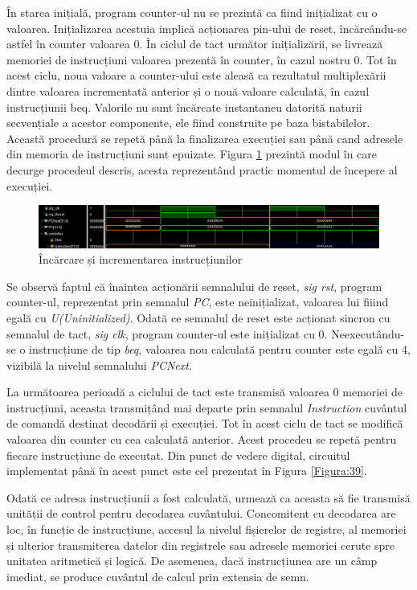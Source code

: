 \documentclass[12pt]{article}
\begin{document}
 În starea inițială, program counter-ul nu se prezintă ca fiind inițializat cu o valoarea. Inițializarea acestuia implică acționarea pin-ului de reset, încărcându-se astfel în counter valoarea 0. În ciclul de tact următor inițializării, se livrează memoriei de instrucțiuni valoarea prezentă în counter, în cazul nostru 0. Tot în acest ciclu, noua valoare a counter-ului este aleasă ca rezultatul multiplexării dintre valoarea incrementată anterior și o nouă valoare calculată, în cazul instrucțiunii beq. Valorile nu sunt încărcate instantaneu datorită naturii secvențiale a acestor componente, ele fiind construite pe baza bistabilelor. Această procedură se repetă până la finalizarea execuției sau până cand adresele din memoria de instrucțiuni sunt epuizate. Figura \ref{Figura:50} prezintă modul în care decurge procedeul descris, acesta reprezentând practic momentul de începere al execuției.

 \begin{figure}[h!]
 \includegraphics[width=1.025\textwidth]{tbfetch.png}
 \centering
 \caption{Încărcare și incrementarea instrucțiunilor}
 \label{Figura:50}
 \end{figure}
 
 Se observă faptul că înaintea acționării semnalului de reset, \textit{sig rst}, program counter-ul, reprezentat prin semnalul \textit{PC}, este neinițializat, valoarea lui fiiind egală cu \textit{U(Uninitialized)}. Odată ce semnalul de reset este acționat sincron cu semnalul de tact, \textit{sig clk}, program counter-ul este inițializat cu 0. Neexecutându-se o instrucțiune de tip \textit{beq}, valoarea nou calculată pentru counter este egală cu 4, vizibilă la nivelul semnalului \textit{PCNext}.
 
 La următoarea perioadă a ciclului de tact este transmisă valoarea 0 memoriei de instrucțiuni, aceasta transmițând mai departe prin semnalul \textit{Instruction} cuvântul de comandă destinat decodării și execuției. Tot în acest ciclu de tact se modifică valoarea din counter cu cea calculată anterior. Acest procedeu se repetă pentru fiecare instrucțiune de executat. Din punct de vedere digital, circuitul implementat până în acest punct este cel prezentat în Figura \ref{Figura:39}. 

Odată ce adresa instrucțiunii a fost calculată, urmează ca aceasta să fie transmisă unității de control pentru decodarea cuvântului. Concomitent cu decodarea are loc, în funcție de instrucțiune, accesul la nivelul fișierelor de registre, al memoriei și ulterior transmiterea datelor din registrele sau adresele memoriei cerute spre unitatea aritmetică și logică. De asemenea, dacă instrucțiunea are un câmp imediat, se produce cuvântul de calcul prin extensia de semn.
 
\end{document}
